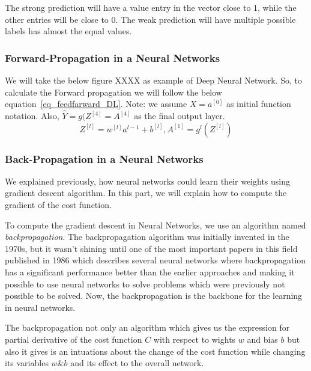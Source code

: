 The strong prediction will have a value entry in the vector close to 1, while the other entries will be close to 0. The weak prediction will have multiple possible labels has almost the equal values\cite{DLFundamentals}.



\subsubsection{Forward-Propagation in a Neural Networks}
We will take the below figure XXXX as example of Deep Neural Network. So, to calculate the Forward propagation we will follow the below equation~\eqref{eq_feedfarward_DL}. Note: we assume $X = a^{[0]}$ as initial function notation. Also, $\widehat{Y}= g(Z^{[4]}=A^{[4]}$ as the final output layer.
\begin{equation}\label{eq_feedfarward_DL}
     Z^{[l]}  = w^{[l]} a^{l-1} + b^{[l]} , A^{[1]} = g^{l}(Z^{[l]})
   \end{equation}



\subsubsection{Back-Propagation in a Neural Networks}

We explained previously,  how neural networks could learn their weights using gradient descent algorithm. In this part, we will explain how to compute the gradient of the cost function.

To compute the gradient descent in Neural Networks, we use an algorithm named \textit{backpropagation}. The backpropagation algorithm was initially invented in the 1970s, but it wasn't shining until one of the most important papers in this field published in 1986 %
which describes several neural networks where backpropagation has a significant performance better than the earlier approaches and making it possible to use neural networks to solve problems which were previously not possible to be solved. Now, the backpropagation is the backbone for the learning in neural networks.%

The backpropagation not only an algorithm which gives us the expression for partial derivative of the cost function $C$ with respect to wights $w$ and bias $b$ but also it gives is an intuations about the change of the cost function while changing its variables $w \& b$ and its effect to the overall network.

